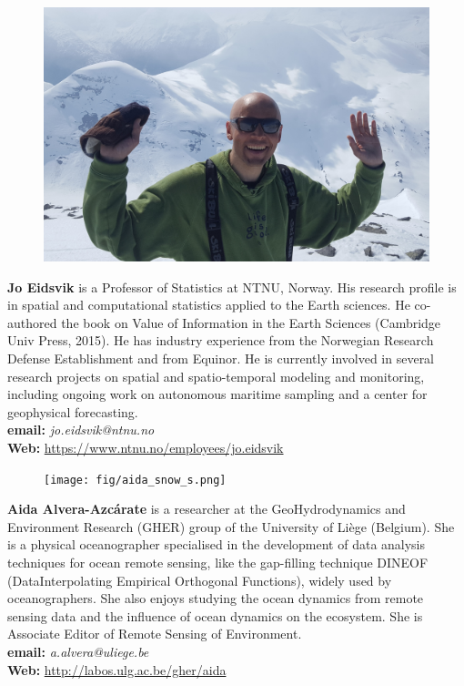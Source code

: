 \vspace{20mm}

\parbox{6.5in}{
\begin{figure} %
    \vspace{-\intextsep}
    \hspace*{-.35\columnsep}\includegraphics[scale=0.055]{fig/Eidsvikpicture.jpg}
\end{figure}
\textbf{Jo Eidsvik} is a Professor of Statistics at NTNU, Norway. His research profile is in spatial and computational statistics applied to the Earth sciences. He co-authored the book on Value of Information in the Earth Sciences (Cambridge Univ Press, 2015). He has industry experience from the Norwegian Research Defense Establishment and from Equinor. He is currently involved in several research projects on spatial and spatio-temporal modeling and monitoring, including ongoing work on autonomous maritime sampling and a center for geophysical forecasting.\\

\textbf{email: }\emph{jo.eidsvik@ntnu.no}\\
\textbf{Web: }\url{https://www.ntnu.no/employees/jo.eidsvik}
}

\vspace{20mm}

\parbox{6.5in}{
\begin{figure} %
    \vspace{-\intextsep}
    \hspace*{-.35\columnsep}\texttt{[image: fig/aida\_snow\_s.png]}
\end{figure}
\textbf{Aida Alvera-Azcárate} is a researcher at the GeoHydrodynamics and Environment Research (GHER) group of the University of Liège (Belgium). She is a physical oceanographer specialised in the development of data analysis techniques for ocean remote sensing, like the gap-filling technique DINEOF (DataInterpolating Empirical Orthogonal Functions), widely used by oceanographers. She also enjoys studying the ocean dynamics from remote sensing data and the influence of ocean dynamics on the ecosystem. She is Associate Editor of Remote Sensing of Environment.\\

\textbf{email: }\emph{a.alvera@uliege.be}\\
\textbf{Web: }\url{http://labos.ulg.ac.be/gher/aida}
}
